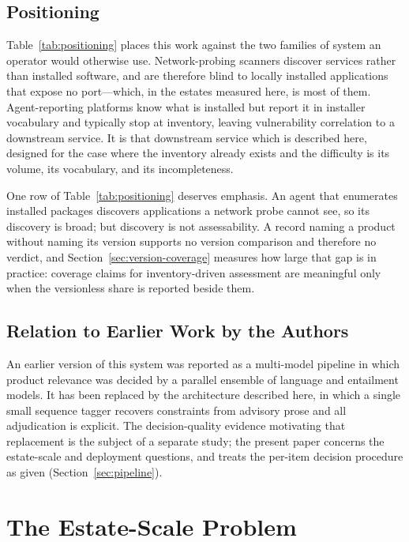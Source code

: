 \documentclass[fleqn,10pt,lineno]{wlpeerj}
\begin{document}
\subsection{Positioning}
Table~\ref{tab:positioning} places this work against the two families of system an operator would otherwise use. Network-probing scanners discover services rather than installed software, and are therefore blind to locally installed applications that expose no port---which, in the estates measured here, is most of them. Agent-reporting platforms know what is installed but report it in installer vocabulary and typically stop at inventory, leaving vulnerability correlation to a downstream service. It is that downstream service which is described here, designed for the case where the inventory already exists and the difficulty is its volume, its vocabulary, and its incompleteness.



One row of Table~\ref{tab:positioning} deserves emphasis. An agent that enumerates installed packages discovers applications a network probe cannot see, so its discovery is broad; but discovery is not assessability. A record naming a product without naming its version supports no version comparison and therefore no verdict, and Section~\ref{sec:version-coverage} measures how large that gap is in practice: coverage claims for inventory-driven assessment are meaningful only when the versionless share is reported beside them.

\subsection{Relation to Earlier Work by the Authors}
An earlier version of this system was reported as a multi-model pipeline in which product relevance was decided by a parallel ensemble of language and entailment models. It has been replaced by the architecture described here, in which a single small sequence tagger recovers constraints from advisory prose and all adjudication is explicit. The decision-quality evidence motivating that replacement is the subject of a separate study; the present paper concerns the estate-scale and deployment questions, and treats the per-item decision procedure as given (Section~\ref{sec:pipeline}).

\section{The Estate-Scale Problem}
\label{sec:problem}
\end{document}
